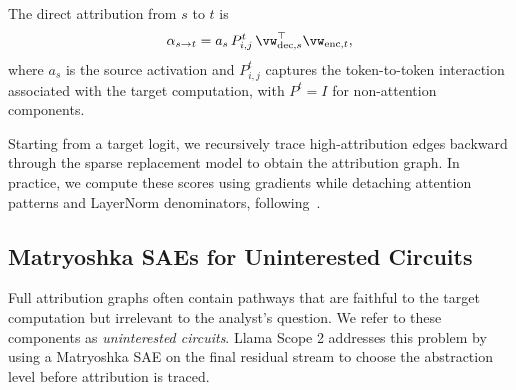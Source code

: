 \documentclass{article}
\begin{document}
The direct attribution from $s$ to $t$ is
\begin{equation}
    \alpha_{s \rightarrow t}
    =
    a_s\,
    P^{t}_{i,j}\,
    \vw_{\mathrm{dec},s}^{\top}
    \vw_{\mathrm{enc},t},
    \label{eq:direct_attribution_score}
\end{equation}
where $a_s$ is the source activation and $P^{t}_{i,j}$ captures the
token-to-token interaction associated with the target computation, with
$P^{t}=I$ for non-attention components.

Starting from a target logit, we recursively trace high-attribution edges
backward through the sparse replacement model to obtain the attribution graph.
In practice, we compute these scores using gradients while detaching attention
patterns and LayerNorm denominators, following~\citet{ameisen2025circuit}.

\subsection{Matryoshka SAEs for Uninterested Circuits}
\label{sec:matryoshka_uninterested_circuits}

Full attribution graphs often contain pathways that are faithful to the target
computation but irrelevant to the analyst's question. We refer to these
components as \emph{uninterested circuits}. Llama Scope 2 addresses this problem
by using a Matryoshka SAE on the final residual stream to choose the abstraction
level before attribution is traced.
\end{document}

